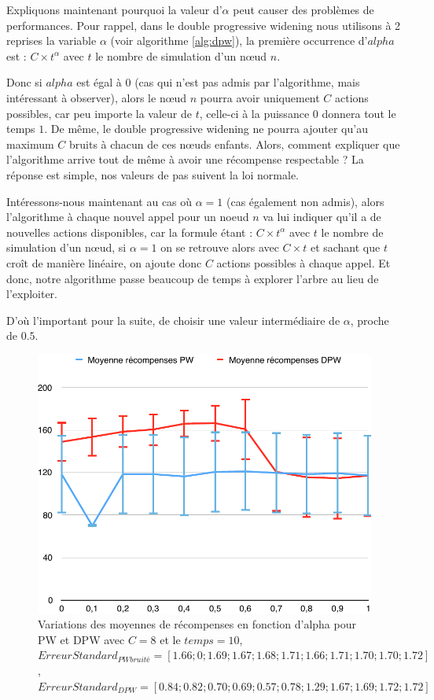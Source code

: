 \documentclass[pdftex,french, english]{article}	%
\begin{document}
    Expliquons maintenant pourquoi la valeur d'$\alpha$ peut causer des problèmes de performances. 
    Pour rappel, dans le double progressive widening nous utilisons à 2 reprises la variable $\alpha$ (voir algorithme \ref{alg:dpw}), la première occurrence d'$alpha$ est : $C \times t^\alpha$ avec $t$ le nombre de simulation d'un nœud $n$.
    
    Donc si $alpha$ est égal à $0$ (cas qui n'est pas admis par l'algorithme, mais intéressant à observer), alors le nœud $n$ pourra avoir uniquement $C$ actions possibles, car peu importe la valeur de $t$, celle-ci à la puissance $0$ donnera tout le temps $1$. De même, le double progressive widening ne pourra ajouter qu’au maximum $C$ bruits à chacun de ces nœuds enfants. Alors, comment expliquer que l'algorithme arrive tout de même à avoir une récompense respectable ? 
    La réponse est simple, nos valeurs de pas suivent la loi normale.
    
    Intéressons-nous maintenant au cas où $\alpha = 1$ (cas également non admis), alors l'algorithme à chaque nouvel appel pour un noeud $n$ va lui indiquer qu'il a de nouvelles actions disponibles, car la formule étant : $C \times t^\alpha$ avec $t$ le nombre de simulation d'un nœud, si $\alpha=1$ on se retrouve alors avec $C \times t$ et sachant que $t$ croît de manière linéaire, on ajoute donc $C$ actions possibles à chaque appel. Et donc, notre algorithme passe beaucoup de temps à explorer l'arbre au lieu de l'exploiter.
    
    D'où l'important pour la suite, de choisir une valeur intermédiaire de $\alpha$, proche de $0.5$.
    
    \begin{figure}[H]
		\centering
		\includegraphics[width=\textwidth]{VariationDAlpha_PWvsDPW.pdf}
		\caption{Variations des moyennes de récompenses en fonction d'alpha pour PW et DPW avec $C = 8$ et le $temps = 10$, $ErreurStandard_{PWbruité} = [1.66 ; 0 ; 1.69 ; 1.67 ; 1.68 ; 1.71 ; 1.66 ; 1.71 ; 1.70 ; 1.70 ; 1.72]$, $ErreurStandard_{DPW} = [0.84 ; 0.82 ; 0.70 ; 0.69 ; 0.57 ; 0.78 ; 1.29 ; 1.67 ; 1.69 ; 1.72 ; 1.72]$}
		 \label{fig:VariationDAlpha_PWvsDPW}
	\end{figure}
    
\end{document}
